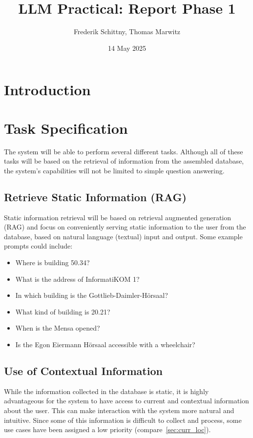 \documentclass{article}
\title{LLM Practical: Report Phase 1}
\author{Frederik Schittny, Thomas Marwitz}
\date{14 May 2025}
\begin{document}
\maketitle

\section{Introduction}

\section{Task Specification}
The system will be able to perform several different tasks. Although all of these tasks will be based on the retrieval of information from the assembled database, the system's capabilities will not be limited to simple question answering.

\subsection{Retrieve Static Information (RAG)} \label{sec:stat_info}
Static information retrieval will be based on retrieval augmented generation (RAG) and focus on conveniently serving static information to the user from the database, based on natural language (textual) input and output. Some example prompts could include:
  \begin{itemize}
      \item Where is building 50.34?
      \item What is the address of InformatiKOM 1?
      \item In which building is the Gottlieb-Daimler-Hörsaal?
      \item What kind of building is 20.21?
      \item When is the Mensa opened?
      \item Is the Egon Eiermann Hörsaal accessible with a wheelchair?
  \end{itemize}

\subsection{Use of Contextual Information}
While the information collected in the database is static, it is highly advantageous for the system to have access to current and contextual information about the user. This can make interaction with the system more natural and intuitive. Since some of this information is difficult to collect and process, some use cases have been assigned a low priority (compare~\ref{sec:curr_loc}).
\end{document}

